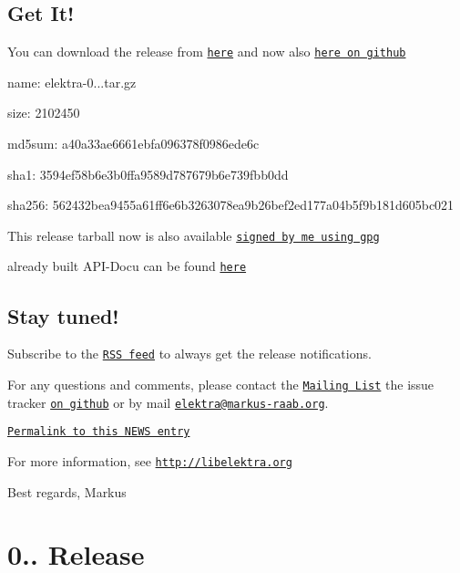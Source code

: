 \subsection*{Get It!}

You can download the release from \href{http://www.libelektra.org/ftp/elektra/releases/elektra-0.8.12.tar.gz}{\tt here} and now also \href{https://github.com/ElektraInitiative/ftp/tree/master/releases/elektra-0.8.12.tar.gz}{\tt here on github}


\begin{DoxyItemize}
\item name\+: elektra-\/0...\+tar.\+gz
\item size\+: 2102450
\item md5sum\+: a40a33ae6661ebfa096378f0986ede6c
\item sha1\+: 3594ef58b6e3b0ffa9589d787679b6e739fbb0dd
\item sha256\+: 562432bea9455a61ff6e6b3263078ea9b26bef2ed177a04b5f9b181d605bc021
\end{DoxyItemize}

This release tarball now is also available \href{http://www.libelektra.org/ftp/elektra/releases/elektra-0.8.12.tar.gz.gpg}{\tt signed by me using gpg}

already built A\+P\+I-\/\+Docu can be found \href{http://doc.libelektra.org/api/0.8.12/html/}{\tt here}

\subsection*{Stay tuned!}

Subscribe to the \href{http://doc.libelektra.org/news/feed.rss}{\tt R\+S\+S feed} to always get the release notifications.

For any questions and comments, please contact the \href{https://lists.sourceforge.net/lists/listinfo/registry-list}{\tt Mailing List} the issue tracker \href{http://git.libelektra.org/issues}{\tt on github} or by mail \href{mailto:elektra@markus-raab.org}{\tt elektra@markus-\/raab.\+org}.

\href{http://doc.libelektra.org/news/98770541-32a1-486a-98a1-d02f26afc81a.html}{\tt Permalink to this N\+E\+W\+S entry}

For more information, see \href{http://libelektra.org}{\tt http\+://libelektra.\+org}

Best regards, Markus

\section*{0.. Release}


